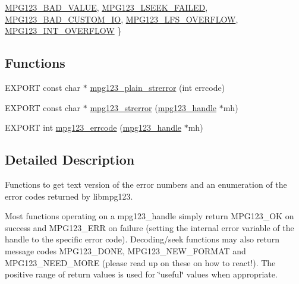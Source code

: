 \begin{DoxyCompactItemize}
\hyperlink{group__mpg123__error_ggac50432012aeaf7c23014de3198dfa5fdaebc536f5fffaa1abe7243434cf2d353e}{M\+P\+G123\+\_\+\+B\+A\+D\+\_\+\+V\+A\+L\+UE}, 
\newline
\hyperlink{group__mpg123__error_ggac50432012aeaf7c23014de3198dfa5fda102bd78ff1fad6cce594e22ea6fb0698}{M\+P\+G123\+\_\+\+L\+S\+E\+E\+K\+\_\+\+F\+A\+I\+L\+ED}, 
\hyperlink{group__mpg123__error_ggac50432012aeaf7c23014de3198dfa5fda9968b3ba91db9dd166fa8421572bda52}{M\+P\+G123\+\_\+\+B\+A\+D\+\_\+\+C\+U\+S\+T\+O\+M\+\_\+\+IO}, 
\hyperlink{group__mpg123__error_ggac50432012aeaf7c23014de3198dfa5fda7ecc133213daa350d801a9e1dc3028e3}{M\+P\+G123\+\_\+\+L\+F\+S\+\_\+\+O\+V\+E\+R\+F\+L\+OW}, 
\hyperlink{group__mpg123__error_ggac50432012aeaf7c23014de3198dfa5fda29cadbffa0da2fc28d1d83e59211b86e}{M\+P\+G123\+\_\+\+I\+N\+T\+\_\+\+O\+V\+E\+R\+F\+L\+OW}
 \}
\end{DoxyCompactItemize}
\subsection*{Functions}
\begin{DoxyCompactItemize}
\item 
E\+X\+P\+O\+RT const char $\ast$ \hyperlink{group__mpg123__error_ga0254f1c6f70074fa404e85735735ca0c}{mpg123\+\_\+plain\+\_\+strerror} (int errcode)
\item 
E\+X\+P\+O\+RT const char $\ast$ \hyperlink{group__mpg123__error_gae0e1d1de1a98df0b372300e287e66d05}{mpg123\+\_\+strerror} (\hyperlink{group__mpg123__init_ga6728e2839a395f3a07d4514da659faca}{mpg123\+\_\+handle} $\ast$mh)
\item 
E\+X\+P\+O\+RT int \hyperlink{group__mpg123__error_gaa6146d20e862ce10568ac2600a890680}{mpg123\+\_\+errcode} (\hyperlink{group__mpg123__init_ga6728e2839a395f3a07d4514da659faca}{mpg123\+\_\+handle} $\ast$mh)
\end{DoxyCompactItemize}


\subsection{Detailed Description}
Functions to get text version of the error numbers and an enumeration of the error codes returned by libmpg123.

Most functions operating on a mpg123\+\_\+handle simply return M\+P\+G123\+\_\+\+OK on success and M\+P\+G123\+\_\+\+E\+RR on failure (setting the internal error variable of the handle to the specific error code). Decoding/seek functions may also return message codes M\+P\+G123\+\_\+\+D\+O\+NE, M\+P\+G123\+\_\+\+N\+E\+W\+\_\+\+F\+O\+R\+M\+AT and M\+P\+G123\+\_\+\+N\+E\+E\+D\+\_\+\+M\+O\+RE (please read up on these on how to react!). The positive range of return values is used for \char`\"{}useful\char`\"{} values when appropriate. 

